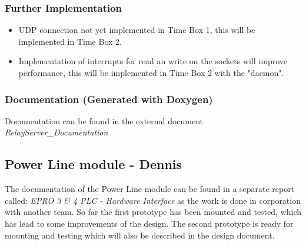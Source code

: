 \subsubsection{Further Implementation}

\begin{itemize}
	\item UDP connection not yet implemented in Time Box 1, this will be implemented in Time Box 2.
	\item Implementation of interrupts for read an write on the sockets will improve performance, this will be implemented in Time Box 2 with the "daemon".
\end{itemize}

\subsubsection{Documentation (Generated with Doxygen)}

Documentation can be found in the external document \textit{RelayServer\_Documentation}

\subsection{Power Line module - Dennis}
The documentation of the Power Line module can be found in a separate report called: \textit{EPRO 3 \& 4 PLC - Hardware Interface} as the work is done in corporation with another team. So far the first prototype has been mounted and tested, which has lead to some improvements of the design. The second prototype is ready for mounting and testing which will also be described in the design document. 

